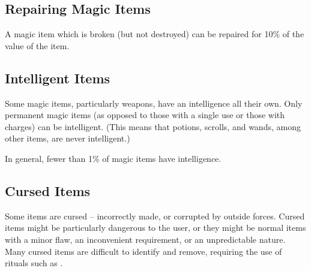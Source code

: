     \subsection{Repairing Magic Items}

        A magic item which is broken (but not destroyed) can be repaired for 10\% of the value of the item.

    \subsection{Intelligent Items}

        Some magic items, particularly weapons, have an intelligence all their own.
        Only permanent magic items (as opposed to those with a single use or those with charges) can be intelligent.
        (This means that potions, scrolls, and wands, among other items, are never intelligent.)

        In general, fewer than 1\% of magic items have intelligence.

    \subsection{Cursed Items}

        Some items are cursed -- incorrectly made, or corrupted by outside forces.
        Cursed items might be particularly dangerous to the user, or they might be normal items with a minor flaw, an inconvenient requirement, or an unpredictable nature.
        Many cursed items are difficult to identify and remove, requiring the use of rituals such as .
